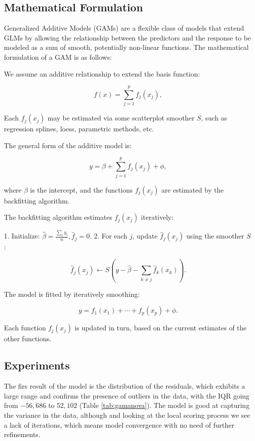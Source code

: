 \documentclass[a4paper, 11pt]{article}
\begin{document}
\begin{multicols}{2}
\subsection{Mathematical Formulation}

Generalized Additive Models (GAMs) are a flexible class of models that extend GLMs by allowing the relationship between the predictors and the response to be modeled as a sum of smooth, potentially non-linear functions.
The mathematical formulation of a GAM is as follows:

We assume an additive relationship to extend the basis function:

\[
f(x) = \sum_{j=1}^p f_j(x_j),
\]


Each \( f_j(x_j) \) may be estimated via some scatterplot smoother \( S \), such as regression splines, loess, parametric methods, etc.

The general form of the additive model is:

\[
y = \beta + \sum_{j=1}^p f_j(x_j) + \phi,
\]

where \( \beta \) is the intercept, and the functions \( f_j(x_j) \) are estimated by the backfitting algorithm.


The backfitting algorithm estimates \( f_j(x_j) \) iteratively:

1. Initialize: \( \hat{\beta} = \frac{\sum_{i} y_i}{n}, \hat{f}_j = 0 \).
2. For each \( j \), update \( \hat{f}_j(x_j) \) using the smoother \( S \):

\[
\hat{f}_j(x_j) \leftarrow S \left( y - \hat{\beta} - \sum_{k \neq j} \hat{f}_k(x_k) \right).
\]



The model is fitted by iteratively smoothing:

\[
y = f_1(x_1) + \cdots + f_p(x_p) + \phi.
\]

Each function \( f_j(x_j) \) is updated in turn, based on the current estimates of the other functions.




\subsection{Experiments}
The firs result of the model is the distribution of the residuals, which exhibits a large range and confirms the presence of outliers in the data, with the IQR going from $-56,686$ to $52,102$ (Table \ref{tab:gamanova}). The model is good at capturing the variance in the data, although and looking at the local scoring process we see a lack of iterations, which means model convergence with no need of further refinements.


\end{multicols}
\end{document}
